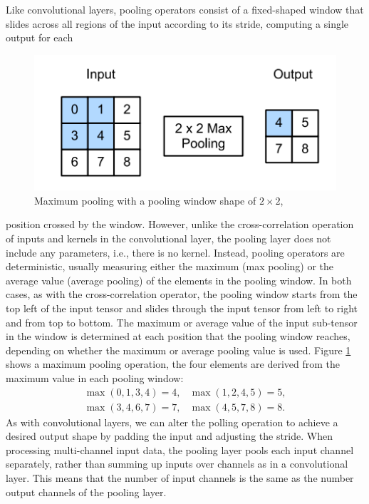 \documentclass[12pt]{report}
\numberwithin{equation}{section}
\begin{document}
Like convolutional layers, pooling operators consist of a fixed-shaped window that slides across all regions of the input according to its stride, computing a single output for each 
\begin{figure}[H]
\centering
\includegraphics[scale=0.9]{png/pooling.png}
\caption[Maximum pooling with a pooling window shape of $2 \times 2$]{Maximum pooling with a pooling window shape of $2 \times 2$, \textbf{\cite{zhang2020dive}}}
\label{fig:pool}
\end{figure} \noindent
position crossed by the window. However, unlike the cross-correlation operation of inputs and kernels in the convolutional layer, the pooling layer does not include any parameters, i.e., there is no kernel. Instead, pooling operators are deterministic, usually measuring either the maximum (max pooling) or the average value (average pooling) of the elements in the pooling window. In both cases, as with the cross-correlation operator, the pooling window starts from the top left of the input tensor and slides through the input tensor from left to right and from top to bottom. The maximum or average value of the input sub-tensor in the window is determined at each position that the pooling window reaches, depending on whether the maximum or average pooling value is used. Figure \ref{fig:pool} shows a maximum pooling operation, the four elements are derived from the maximum value in each pooling window:
\begin{equation}
\begin{array}{ll}
\max (0,1,3,4)=4, & \max (1,2,4,5)=5, \\
\max (3,4,6,7)=7, & \max (4,5,7,8)=8. 
\end{array}
\end{equation} \noindent
As with convolutional layers, we can alter the polling operation to achieve a desired output shape by padding the input and adjusting the stride. When processing multi-channel input data, the pooling layer pools each input channel separately, rather than summing up inputs over channels as in a convolutional layer. This means that the number of input channels is the same as the number output channels of the pooling layer.
\end{document}
